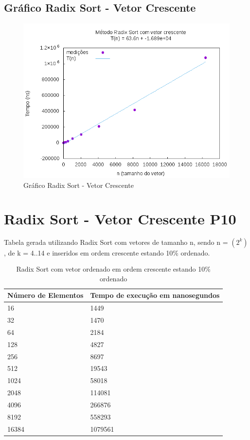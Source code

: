\documentclass[12pt,a4paper,twoside]{report}
\begin{document}
\subsection{Gráfico Radix Sort - Vetor Crescente}
\begin{figure}[H]
    \centering
    \includegraphics[width=0.7\linewidth]{graficos/RadixSort/vIntCrescente/vIntCrescente.png}
  \caption{Gráfico Radix Sort - Vetor Crescente}
\end{figure}

\section{Radix Sort - Vetor Crescente P10}
Tabela gerada utilizando Radix Sort com vetores de tamanho n, sendo n = $(2^k)$, de k = 4..14 e inseridos em ordem crescente estando 10\% ordenado.
\begin{table}[H]
\centering
\caption{Radix Sort com vetor ordenado em ordem crescente estando 10\% ordenado}
\label{my-label}
\begin{tabular}{|l|l|}
\hline
\multicolumn{1}{|c|}{\textbf{Número de Elementos}} & \multicolumn{1}{c|}{\textbf{Tempo de execução em nanosegundos}} \\ \hline
16 & 1449 \\ \hline
32 & 1470 \\ \hline
64 & 2184 \\ \hline
128 & 4827 \\ \hline
256 & 8697 \\ \hline
512 & 19543 \\ \hline
1024 & 58018 \\ \hline
2048 & 114081 \\ \hline
4096 & 266876 \\ \hline
8192 & 558293 \\ \hline
16384 & 1079561 \\ \hline
\end{tabular}
\end{table}
\end{document}
